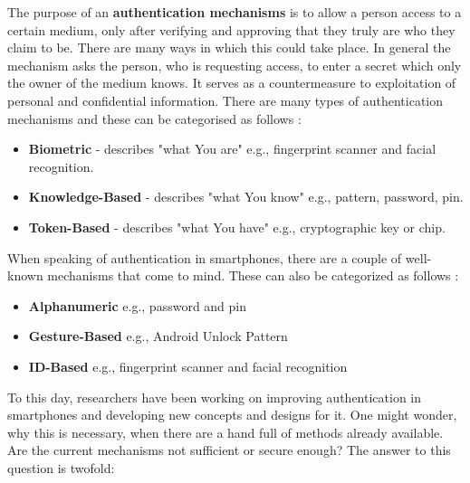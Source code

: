 The purpose of an \textbf{authentication mechanisms} is to allow a person access to a certain medium, only after verifying and approving that they truly are who they claim to be. There are many ways in which this could take place. In general the mechanism asks the person, who is requesting access, to enter a secret which only the owner of the medium knows. It serves as a countermeasure to exploitation of personal and confidential information. There are many types of authentication mechanisms and these can be categorised as follows \cite{gorman}:  
\begin{itemize}
    \item \textbf{Biometric} - describes "what You are" e.g., fingerprint scanner and facial recognition.
    \item \textbf{Knowledge-Based} - describes "what You know" e.g., pattern, password, pin.
    \item \textbf{Token-Based} - describes "what You have" e.g., cryptographic key or chip.
\end{itemize}


When speaking of authentication in smartphones, there are a couple of well-known mechanisms that come to mind. These can also be categorized as follows \cite{ediss20251,gorman} : 
\begin{itemize}
    \item \textbf{Alphanumeric} e.g., password and pin
    \item \textbf{Gesture-Based} e.g., Android Unlock Pattern
    \item \textbf{ID-Based} e.g., fingerprint scanner and facial recognition 
\end{itemize}

To this day, researchers have been working on improving authentication in smartphones and developing new concepts and designs for it. One might wonder, why this is necessary, when there are a hand full of methods already available. Are the current mechanisms not sufficient or secure enough? The answer to this question is twofold:\\

